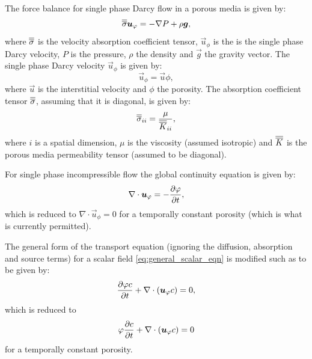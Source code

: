 The force balance for single phase Darcy flow in a porous media is given by:
\begin{equation}
   \label{eq:mom_press_single_phase_darcy}
   \overline{\overline{\sigma}} {\mbox{\boldmath$u$}}_{\varphi} = 
   - \nabla P + \rho {\mbox{\boldmath$g$}},
\end{equation}
where $\overline{\overline{\sigma}}$ is the velocity absorption coefficient tensor, $\vec{u}_{\phi}$ is the is the single phase Darcy velocity, $P$ is the pressure, $\rho$ the density and $\vec{g}$ the gravity vector. The single phase Darcy velocity $\vec{u}_{\phi}$ is given by:
\begin{equation}
   \vec{u}_{\phi} = \vec{u} \phi,
\end{equation}
where $\vec{u}$ is the interstitial velocity and $\phi$ the porosity. The absorption coefficient tensor $\overline{\overline{\sigma}}$, assuming that it is diagonal, is given by:
\begin{equation}
   \label{eq:single_phase_darcy_velocity_abs}
   \overline{\overline{\sigma}}_{ii} = \frac{ \mu } { \overline{\overline{K}}_{ii} },
\end{equation}
where $i$ is a spatial dimension, $\mu$ is the viscosity (assumed isotropic) and $\overline{\overline{K}}$ is the porous media permeability tensor (assumed to be diagonal).

For single phase incompressible flow the global continuity equation is given by:
\begin{equation} 
   \label{eq:cty_single_phase_darcy}
   \nabla\cdot {\mbox{\boldmath$u$}}_{\varphi} = - \frac{\partial\varphi}{\partial t},
\end{equation}
which is reduced to $\nabla\cdot \vec{u}_{\phi} = 0$ for a temporally constant porosity (which is what is currently permitted).

The general form of the transport equation (ignoring the diffusion, absorption and source terms) for a scalar field \eqref{eq:general_scalar_eqn} is modified such as to be given by:
\begin{equation}
   \label{eq:general_scalar_eqn_single_phase_darcy}
   \frac{\partial\varphi c}{\partial t} + \nabla\cdot({\mbox{\boldmath$u$}}_{\varphi} c) = 0,
\end{equation}
which is reduced to
\begin{equation}
   \varphi \frac{\partial c}{\partial t} + \nabla\cdot({\mbox{\boldmath$u$}}_{\varphi} c) = 0
\end{equation}
for a temporally constant porosity.
